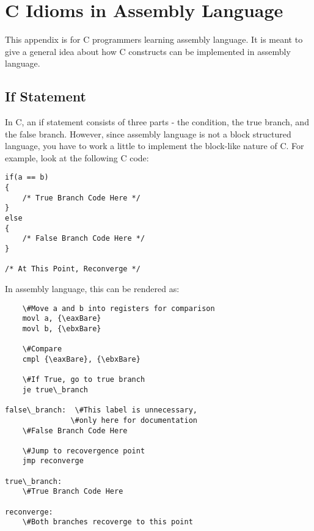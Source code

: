 \chapter{C Idioms in Assembly Language}
\label{ctranslationap}

% 
% 
% 
% 

This appendix is for C programmers learning assembly language.  It is meant to
give a general idea about how C constructs can be implemented in assembly 
language.

\section{If Statement}

In C, an if statement consists of three parts - the condition, the true branch, and the false branch.  However, since assembly language is not
a block structured language, you have to work a little to implement
the block-like nature of C.  For example, look at the following C code:

\begin{simpletyping}
\begin{lstlisting}
if(a == b)
{
	/* True Branch Code Here */
}
else
{
	/* False Branch Code Here */
}

/* At This Point, Reconverge */
\end{lstlisting}
\end{simpletyping}

In assembly language, this can be rendered as:

\begin{simpletyping}
\begin{lstlisting}
	\#Move a and b into registers for comparison
	movl a, {\eaxBare}
	movl b, {\ebxBare}

	\#Compare
	cmpl {\eaxBare}, {\ebxBare}

	\#If True, go to true branch
	je true\_branch

false\_branch:  \#This label is unnecessary, 
               \#only here for documentation
	\#False Branch Code Here

	\#Jump to recovergence point
	jmp reconverge

true\_branch:
	\#True Branch Code Here

reconverge:
	\#Both branches recoverge to this point
\end{lstlisting}
\end{simpletyping}

